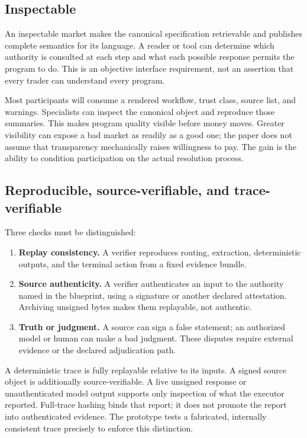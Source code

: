 \documentclass[10pt]{article}
\begin{document}
\subsection{Inspectable}

An inspectable market makes the canonical specification retrievable and publishes complete semantics for its language. A reader or tool can determine which authority is consulted at each step and what each possible response permits the program to do. This is an objective interface requirement, not an assertion that every trader can understand every program.

Most participants will consume a rendered workflow, trust class, source list, and warnings. Specialists can inspect the canonical object and reproduce those summaries. This makes program quality visible before money moves. Greater visibility can expose a bad market as readily as a good one; the paper does not assume that transparency mechanically raises willingness to pay. The gain is the ability to condition participation on the actual resolution process.

\subsection{Reproducible, source-verifiable, and trace-verifiable}

Three checks must be distinguished:
\begin{enumerate}
\item \textbf{Replay consistency.} A verifier reproduces routing, extraction, deterministic outputs, and the terminal action from a fixed evidence bundle.
\item \textbf{Source authenticity.} A verifier authenticates an input to the authority named in the blueprint, using a signature or another declared attestation. Archiving unsigned bytes makes them replayable, not authentic.
\item \textbf{Truth or judgment.} A source can sign a false statement; an authorized model or human can make a bad judgment. These disputes require external evidence or the declared adjudication path.
\end{enumerate}

A deterministic trace is fully replayable relative to its inputs. A signed source object is additionally source-verifiable. A live unsigned response or unauthenticated model output supports only inspection of what the executor reported. Full-trace hashing binds that report; it does not promote the report into authenticated evidence. The prototype tests a fabricated, internally consistent trace precisely to enforce this distinction.
\end{document}
